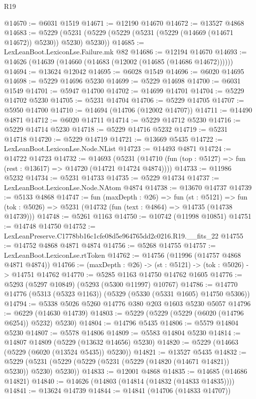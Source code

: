 \begin{lexlean}{R19}
\begin{coremodule}
@14670 := @6031 @1519
@14671 := @12190 @14670
@14672 := @13527 @4868
@14683 := @5229 (@5231 (@5229 (@5229 (@5231 (@5229 (@14669 (@14671 @14672)) @5230)) @5230) @5230))
@14685 := LexLeanBoot.LexiconLse.Failure.mk @82
@14686 := @12194 @14670
@14693 := @14626 (@14639 (@14660 (@14683 (@12002 (@14685 (@14686 @14672))))))
@14694 := @13624 @12042
@14695 := @6028 @1549
@14696 := @6020 @14695
@14698 := @5229 @14696 @5230
@14699 := @5229 @14698
@14700 := @6031 @1549
@14701 := @5947 @14700
@14702 := @14699 @14701
@14704 := @5229 @14702 @5230
@14705 := @5231 @14704
@14706 := @5229 @14705
@14707 := @5950 @14700
@14710 := @14694 (@14706 (@12002 @14707))
@14711 := @14490 @4871
@14712 := @6020 @14711
@14714 := @5229 @14712 @5230
@14716 := @5229 @14714 @5230
@14718 := @5229 @14716 @5232
@14719 := @5231 @14718
@14720 := @5229 @14719
@14721 := @13669 @5435
@14722 := LexLeanBoot.LexiconLse.Node.NList
@14723 := @14493 @4871
@14724 := @14722 @14723
@14732 := @14693
    (@5231 (@14710 (fun (top : @5127) => fun (rest : @13617) => @14720 (@14721 @14724 @4874))))
@14733 := @11986 @5232
@14734 := @5231 @14733
@14735 := @5229 @14734
@14737 := LexLeanBoot.LexiconLse.Node.NAtom @4874
@14738 := @13670 @14737
@14739 := @5133 @4868
@14747 := fun (maxDepth : @26) =>
  fun (st : @5121) =>
  fun (tok : @5026) => @5231 (@14732 (fun (text : @4864) => @14735 (@14738 @14739)))
@14748 := @5261 @1163
@14750 := @10742 (@11998 @10851)
@14751 := @14748 @14750
@14752 := LexLeanPreserve.C1778bb16c1cfe08d5e964765dd2c0216.R19.__fits_22
@14755 := @14752 @4868 @4871 @4874
@14756 := @5268 @14755
@14757 := LexLeanBoot.LexiconLse.rtToken
@14762 := @14756 (@11996 (@14757 @4868 @4871 @4874))
@14766 := (maxDepth : @26) -> (st : @5121) -> (tok : @5026) -> @14751 @14762
@14770 := @5285 @1163 @14750 @14762 @1605
@14776 := @5293 (@5297 @10849) (@5293 (@5300 @11997) @10767)
@14786 := @14770 @14776 (@5313 (@5323 @1163)) (@5329 (@5330 (@5331 @1605) @14750 @5306))
@14794 := @5338 @5026 @5260 @14776 @380 @203 @1603 @5230 @5057
@14796 := @6229 (@14630 @14739)
@14803 := @5229 (@5229 (@5229 (@6020 (@14796 @6254)) @5232) @5230)
@14804 := @14796 @5435
@14806 := @5579 @14804 @5230
@14807 := @5578 @14806
@14809 := @5583 @14804 @5230
@14814 := @14807 @14809 (@5229 (@13632 @14656) @5230)
@14820 := @5229 (@14663 (@5229 (@6020 (@13524 @5435)) @5230))
@14821 := @13527 @5435
@14832 := @5229 (@5231 (@5229 (@5229 (@5231 (@5229 (@14820 (@14671 @14821)) @5230)) @5230) @5230))
@14833 := @12001 @4868
@14835 := @14685 (@14686 @14821)
@14840 := @14626 (@14803 (@14814 (@14832 (@14833 @14835))))
@14841 := @13624 @14739
@14844 := @14841 (@14706 (@14833 @14707))

\end{coremodule}
\end{lexlean}

